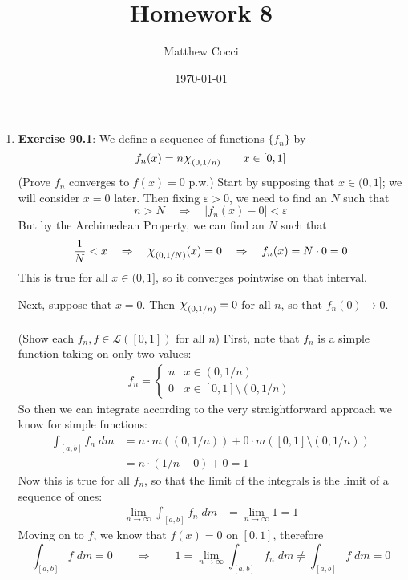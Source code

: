 \documentclass[12pt]{article}
\author{Matthew Cocci}
\title{\textbf{Homework 8}}
\date{\today}
\theoremstyle{plain}
\theoremstyle{definition}
\theoremstyle{remark}
\newcommand*{\Chi}{\mbox{\large$\chi$}} %
\begin{document}
\maketitle 

\begin{enumerate} 

\item \textbf{Exercise 90.1}: We define a sequence of functions $\{f_n\}$ by
\[
    f_n(x) = n \Chi_{(0,1/n)}
    \qquad x \in [0,1]
\]
(Prove $f_n$ converges to $f(x)=0$ p.w.) Start by supposing that $x\in(0,1]$; we will consider $x=0$ later. Then fixing $\varepsilon>0$, we need to find an $N$ such that
\[
    n>N
    \quad \Rightarrow \quad
    |f_n(x) - 0 | < \varepsilon
\]
But by the Archimedean Property, we can find an $N$ such that 
\[
    \frac{1}{N} < x
    \quad \Rightarrow \quad
    \Chi_{(0,1/N)}(x) = 0
    \quad \Rightarrow \quad
    f_n(x) = N\cdot 0 = 0
\]
This is true for all $x\in(0,1]$, so it converges pointwise on that interval.

Next, suppose that $x=0$. Then $\Chi_{(0,1/n)} = 0$ for all $n$, so that $f_n(0)\rightarrow 0$.
\\
\\
(Show each $f_n, f\in\mathscr{L}([0,1])$ for all $n$) First, note that $f_n$ is a simple function taking on only two values:
\begin{align*}
    f_n = 
    \begin{cases} n & x\in(0,1/n)
        \\ 0 & x\in[0,1]\setminus (0,1/n)
    \end{cases}
\end{align*}
So then we can integrate according to the very straightforward approach we know for simple functions:
\begin{align*}
    \int_{[a,b]} f_n \; dm &= 
    n \cdot m\left((0,1/n)\right)
    + 0 \cdot m\left([0,1]\setminus (0,1/n)\right) \\
    &= n \cdot \left( 1/n - 0\right) + 0= 1
\end{align*}
Now this is true for all $f_n$, so that the limit of the integrals is the limit of a sequence of ones:
\begin{align*}
    \lim_{n\rightarrow\infty}
    \int_{[a,b]} f_n \; dm &= 
    \lim_{n\rightarrow\infty} 1 = 1
\end{align*}
Moving on to $f$, we know that $f(x)=0$ on $[0,1]$, therefore
\[
    \int_{[a,b]} f \; dm = 0
    \qquad\Rightarrow\qquad
    1 = \lim_{n\rightarrow\infty}
    \int_{[a,b]} f_n \; dm \neq
    \int_{[a,b]} f \; dm  = 0
\]


\end{enumerate}
\end{document}
